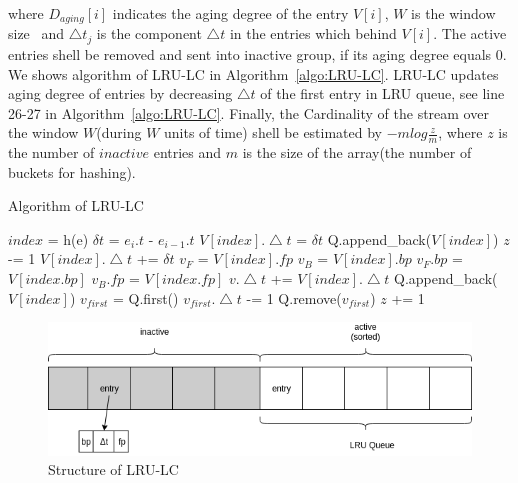 where $D_{aging}[i]$ indicates the aging degree of the entry $V[i]$, $W$ is the
window size~\cite{shan2016lru} and $\bigtriangleup t_j$ is the component
$\bigtriangleup t$ in the entries which behind $V[i]$. The active entries shell
be removed and sent into inactive group, if its aging degree equals 0. We shows
algorithm of LRU-LC in Algorithm~\ref{algo:LRU-LC}. LRU-LC updates aging degree
of entries by decreasing $\bigtriangleup t$ of the first entry in LRU queue, see
line 26-27 in Algorithm~\ref{algo:LRU-LC}. Finally, the Cardinality of the
stream over the window $W$(during $W$ units of time) shell be estimated by $
-mlog\frac{z}{m}$, where $z$ is the number of $inactive$ entries and $m$ is the
size of the array(the number of buckets for hashing).


\begin{algorithm}
\caption{Algorithm of LRU-LC}
\label{algo:LRU-LC}
\begin{algorithmic}[1]
\Input
\EndInput
\Output
\EndOutput

\State $index$ = h(e) 
\State $\delta t$ = $e_i.t$ - $e_{i-1}.t$
    \State $V[index].\bigtriangleup t$ = $\delta t$
    \State Q.append\_back($V[index]$)
    \State $z$ -= 1
\Else {}
     
        \State $V[index].\bigtriangleup t$ += $\delta t$
    \Else
        \State $v_F$ = $V[index].fp$
        \State $v_B$ = $V[index].bp$
        \State $v_F.bp$ = $V[index.bp]$
        \State $v_B.fp$ = $V[index.fp]$
        \State $v.\bigtriangleup t$ += $V[index].\bigtriangleup t$
        \State Q.append\_back($V[index]$)
    \EndIf
\EndIf
\State $v_{first}$ = Q.first() 
\State $v_{first}.\bigtriangleup t$ -= 1
    \State Q.remove($v_{first}$)
    \State $z$ += 1
\EndIf
\end{algorithmic}
\end{algorithm}

\begin{figure}
    \centering
    \includegraphics{figures/LRU-LC.png}
    \caption{Structure of LRU-LC}
    \label{fig:LRU-LC}
\end{figure}

